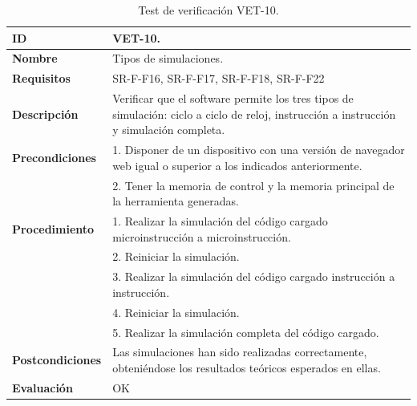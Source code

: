 \begin{center}
\begin{table}[htb]
\centering
\begin{tabular}{@{}p{2.5cm} p{13cm}@{}} 
\toprule
\textbf{ID} 					& VET-10. \\
\midrule
\textbf{Nombre} 				& Tipos de simulaciones. \\
\midrule
\textbf{Requisitos} 		& SR-F-F16, SR-F-F17, SR-F-F18, SR-F-F22\\
\midrule
\textbf{Descripción} 		& Verificar que el software permite los tres tipos de simulación: ciclo a ciclo de reloj, instrucción a instrucción y simulación completa. \\
\midrule
\textbf{Precondiciones}		& 1. Disponer de un dispositivo con una versión de navegador web igual o superior a los indicados anteriormente. \\
											& 2. Tener la memoria de control y la memoria principal de la herramienta generadas. \\
\midrule
\textbf{Procedimiento}		& 1. Realizar la simulación del código cargado microinstrucción a microinstrucción.\\
											& 2. Reiniciar la simulación.\\
											& 3. Realizar la simulación del código cargado instrucción a instrucción.\\
											& 4. Reiniciar la simulación.\\
											& 5. Realizar la simulación completa del código cargado. \\
\midrule
\textbf{Postcondiciones} 		&  Las simulaciones han sido realizadas correctamente, obteniéndose los resultados teóricos esperados en ellas.\\
\midrule
\textbf{Evaluación} 			& OK \\
\bottomrule
\end{tabular}
\caption{Test de verificación VET-10.}
\label{tab:vet10}
\end{table}
\end{center}

